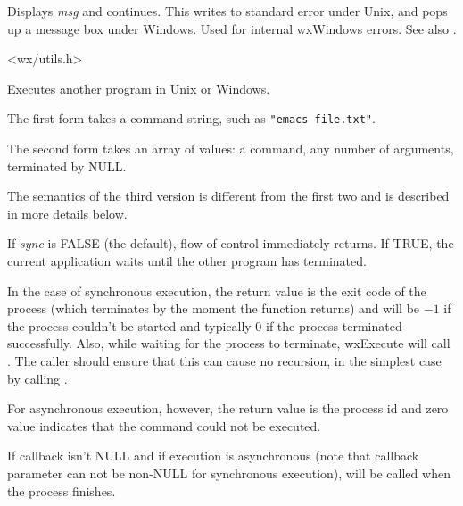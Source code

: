 \label{wxerror}


Displays {\it msg} and continues. This writes to standard error under
Unix, and pops up a message box under Windows. Used for internal
wxWindows errors. See also .


<wx/utils.h>

\label{wxexecute}




Executes another program in Unix or Windows.

The first form takes a command string, such as {\tt "emacs file.txt"}.

The second form takes an array of values: a command, any number of
arguments, terminated by NULL.

The semantics of the third version is different from the first two and is
described in more details below.

If {\it sync} is FALSE (the default), flow of control immediately returns.
If TRUE, the current application waits until the other program has terminated.

In the case of synchronous execution, the return value is the exit code of
the process (which terminates by the moment the function returns) and will be
$-1$ if the process couldn't be started and typically 0 if the process
terminated successfully. Also, while waiting for the process to
terminate, wxExecute will call . The caller
should ensure that this can cause no recursion, in the simplest case by 
calling .

For asynchronous execution, however, the return value is the process id and
zero value indicates that the command could not be executed.

If callback isn't NULL and if execution is asynchronous (note that callback
parameter can not be non-NULL for synchronous execution), 
 will be called when
the process finishes.

